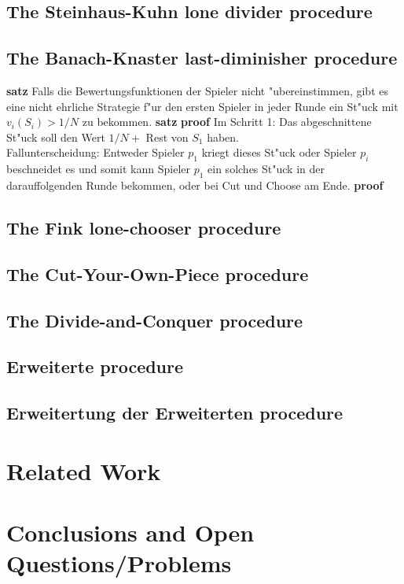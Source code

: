 \subsection{The Steinhaus-Kuhn lone divider procedure}
\newpage
\subsection{The Banach-Knaster last-diminisher procedure}
\textbf{satz}
Falls die Bewertungsfunktionen der Spieler nicht "ubereinstimmen, gibt es eine nicht ehrliche Strategie f"ur den ersten Spieler in jeder Runde ein St"uck mit $v_i(S_i)>1/N$ zu bekommen.
\textbf{satz}
\textbf{proof}
Im Schritt 1: Das abgeschnittene St"uck soll den Wert $1/N+$ Rest von $S_1$ haben.\\
Fallunterscheidung: Entweder Spieler $p_1$ kriegt dieses St"uck oder Spieler $p_i$ beschneidet es und somit kann Spieler $p_1$ ein solches St"uck in der darauffolgenden Runde bekommen, oder bei Cut und Choose am Ende.
\textbf{proof}
\newpage
\subsection{The Fink lone-chooser procedure}
\newpage
\subsection{The Cut-Your-Own-Piece procedure}
\newpage
\subsection{The Divide-and-Conquer procedure}
\newpage
\subsection{Erweiterte procedure}
\newpage
\subsection{Erweitertung der Erweiterten procedure}
\newpage
\section{Related Work}
\pagebreak

\section{Conclusions and Open Questions/Problems}
\pagebreak

